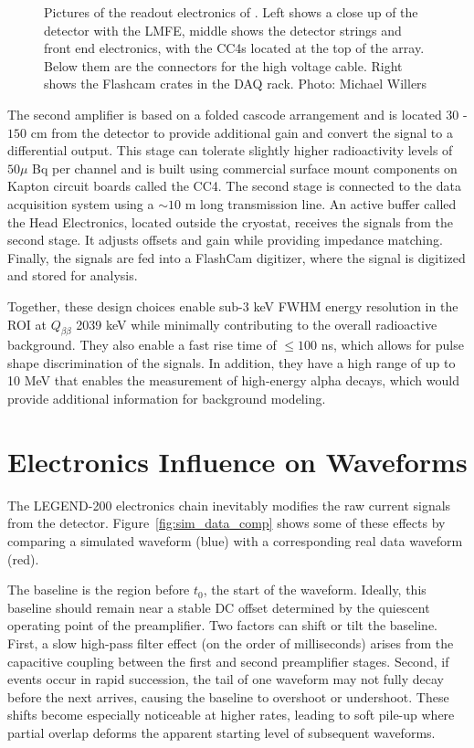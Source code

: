 \begin{figure}[!htb]
    \caption{Pictures of the readout electronics of {\Ltwo}. Left shows a close up of the detector with the LMFE, middle shows the detector strings and front end electronics, with the CC4s located at the top of the array. Below them are the connectors for the high voltage cable. Right shows the Flashcam crates in the DAQ rack. Photo: Michael Willers}
   \label{ch6_fig_l200_elec_model_real}
\end{figure}


The second amplifier is based on a folded cascode arrangement and is located $30$ -$150$ cm from the detector to provide additional gain and convert the signal to a differential output. This stage can tolerate slightly higher radioactivity levels of $50\mu$ Bq per channel and is built using commercial surface mount components on Kapton circuit boards called the CC4. The second stage is connected to the data acquisition system using a $\sim 10$ m long transmission line. An active buffer called the Head Electronics, located outside the cryostat, receives the signals from the second stage. It adjusts offsets and gain while providing impedance matching. Finally, the signals are fed into a FlashCam digitizer, where the signal is digitized and stored for analysis.

Together, these design choices enable sub-$3$ keV FWHM energy resolution in the ROI at $Q_{\beta\beta}$ 2039 keV while minimally contributing to the overall radioactive background. They also enable a fast rise time of $\leq 100$ ns, which allows for pulse shape discrimination of the signals. In addition, they have a high range of up to 10 MeV that enables the measurement of high-energy alpha decays, which would provide additional information for background modeling.

\section{Electronics Influence on Waveforms}
The LEGEND-200 electronics chain inevitably modifies the raw current signals from the detector. Figure~\ref{fig:sim_data_comp} shows some of these effects by comparing a simulated waveform (blue) with a corresponding real data waveform (red).

The baseline is the region before $t_0$, the start of the waveform. Ideally, this baseline should remain near a stable DC offset determined by the quiescent operating point of the preamplifier. Two factors can shift or tilt the baseline. First, a slow high-pass filter effect (on the order of milliseconds) arises from the capacitive coupling between the first and second preamplifier stages. Second, if events occur in rapid succession, the tail of one waveform may not fully decay before the next arrives, causing the baseline to overshoot or undershoot. These shifts become especially noticeable at higher rates, leading to soft pile-up where partial overlap deforms the apparent starting level of subsequent waveforms. 


